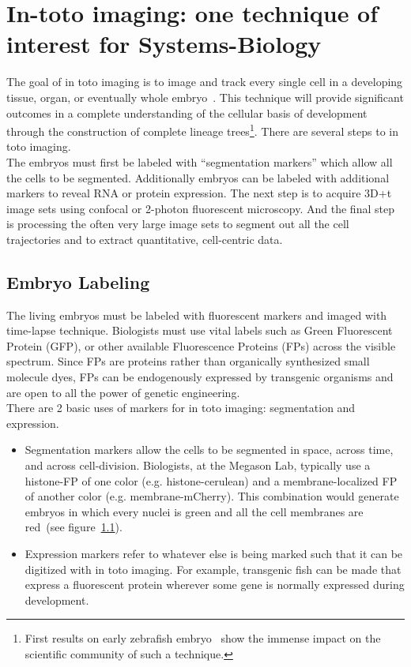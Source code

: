 
\section{In-toto imaging: one technique of interest for Systems-Biology}

The goal of in toto imaging is to image and track every single cell in a
developing tissue, organ, or eventually
whole embryo~\cite{megason2003digitizing}. This technique will provide
significant outcomes in a complete understanding of the cellular basis of
development through the construction of complete lineage trees\footnote{First
results on early zebrafish embryo~\cite{SCIENCE-PAPER} show the immense impact
on the scientific community of such a technique.}. There are several steps to in
toto imaging.\\

The embryos must first be labeled with “segmentation markers” which allow all
the cells to be segmented. Additionally embryos can be labeled with additional
markers to reveal RNA or protein expression. The next step is to acquire 3D+t
image sets using confocal or 2-photon fluorescent microscopy. And the final step
is processing the often very large image sets to segment out all the cell
trajectories and to extract quantitative, cell-centric data.

\subsection{Embryo Labeling}

The living embryos must be labeled with fluorescent markers and imaged with
time-lapse technique. Biologists must use vital labels such as Green
Fluorescent Protein (GFP), or other available Fluorescence Proteins (FPs) across
the visible spectrum. Since FPs are proteins rather than organically synthesized
small molecule dyes, FPs can be endogenously expressed by transgenic organisms
and are open to all the power of genetic engineering.\\

There are 2 basic uses of markers for in toto imaging: segmentation and
expression.
\begin{itemize}
 \item Segmentation markers allow the cells to be segmented in space,
across time, and across cell-division. Biologists, at the Megason Lab, typically
use a histone-FP of one color (e.g. histone-cerulean) and a membrane-localized
FP of another color (e.g. membrane-mCherry). This combination would generate
embryos in which every nuclei is green and all the cell membranes are red~(see
figure~\ref{}).
 \item Expression markers refer to whatever else is being marked such that it
can be digitized with in toto imaging. For example, transgenic fish can be made
that express a fluorescent protein wherever some gene is normally expressed
during development.
\end{itemize}

